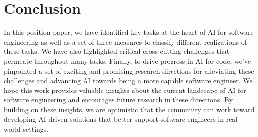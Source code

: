 \section{Conclusion}
In this position paper, we have identified key tasks at the heart of AI for software engineering as well as a set of three measures to classify different realizations of these tasks. We have also highlighted critical cross-cutting challenges that permeate throughout many tasks. Finally, to drive progress in AI for code, we've pinpointed a set of exciting and promising research directions for alleviating these challenges and advancing AI towards being a more capable software engineer.  We hope this work provides valuable insights about the current landscape of AI for software engineering and encourages future research in these directions. By building on these insights, we are optimistic that the community can work toward developing AI-driven solutions that better support software engineers in real-world settings.

